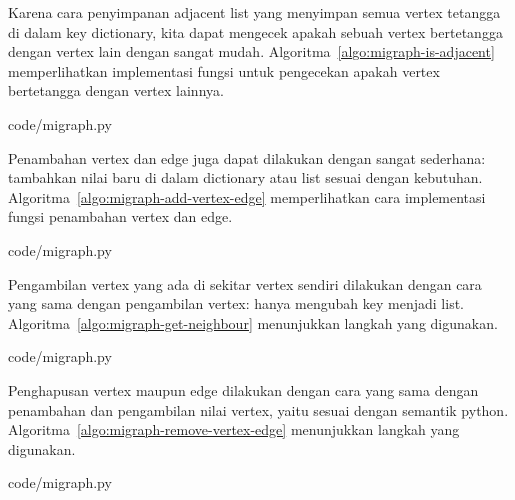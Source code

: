 Karena cara penyimpanan adjacent list yang menyimpan semua vertex tetangga di dalam key dictionary, kita dapat mengecek apakah sebuah vertex bertetangga dengan vertex lain dengan sangat mudah. Algoritma~\ref{algo:migraph-is-adjacent} memperlihatkan implementasi fungsi untuk pengecekan apakah vertex bertetangga dengan vertex lainnya.


                {code/migraph.py}

Penambahan vertex dan edge juga dapat dilakukan dengan sangat sederhana: tambahkan nilai baru di dalam dictionary atau list sesuai dengan kebutuhan. Algoritma~\ref{algo:migraph-add-vertex-edge} memperlihatkan cara implementasi fungsi penambahan vertex dan edge.


                {code/migraph.py}

Pengambilan vertex yang ada di sekitar vertex sendiri dilakukan dengan cara yang sama dengan pengambilan vertex: hanya mengubah key menjadi list. Algoritma~\ref{algo:migraph-get-neighbour} menunjukkan langkah yang digunakan.


                {code/migraph.py}

Penghapusan vertex maupun edge dilakukan dengan cara yang sama dengan penambahan dan pengambilan nilai vertex, yaitu sesuai dengan semantik python. Algoritma~\ref{algo:migraph-remove-vertex-edge} menunjukkan langkah yang digunakan.


                {code/migraph.py}

